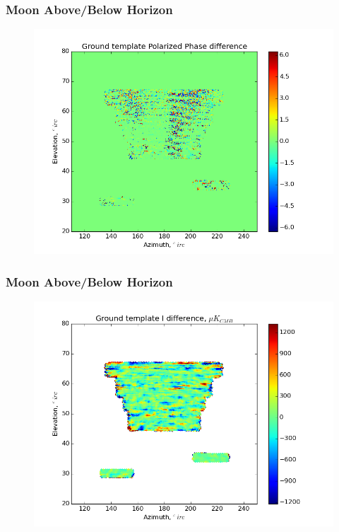 \documentclass{beamer}
\begin{document}
\begin{frame}
\frametitle{Moon Above/Below Horizon}
\begin{figure}
\includegraphics[width=0.9\linewidth]{dArg_gt_MOON_HORIZON.png}
\end{figure}
\end{frame}

\begin{frame}
\frametitle{Moon Above/Below Horizon}
\begin{figure}
\includegraphics[width=0.9\linewidth]{dI_gt_MOON_HORIZON.png}
\end{figure}
\end{frame}
\end{document}
